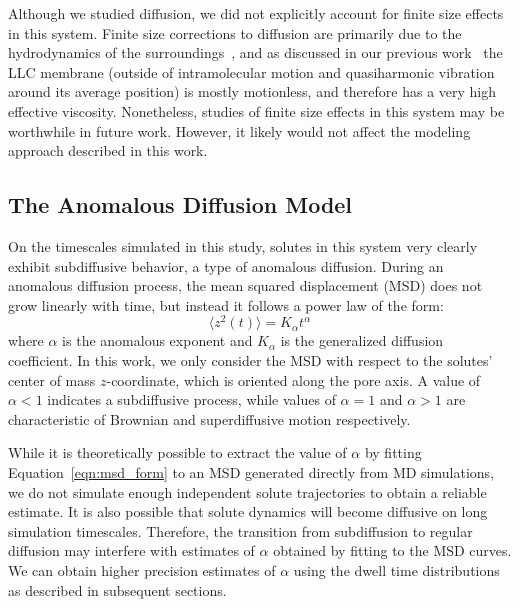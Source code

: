 \documentclass[journal=jctcce,manuscript=article]{achemso}
\begin{document}
  Although we studied diffusion, we did not explicitly account for finite size effects
  in this system. Finite size corrections to diffusion are primarily due to the
  hydrodynamics of the surroundings~\cite{venable_lipid_2017,yeh_system-size_2004}, and
  as discussed in our previous work~\cite{coscia_understanding_2019} the LLC membrane
  (outside of intramolecular motion and quasiharmonic vibration around its average 
  position) is mostly motionless, and therefore has a very high effective viscosity.
  Nonetheless, studies of finite size effects in this system may be worthwhile in
  future work. However, it likely would not affect the modeling approach described in
  this work.

  \subsection{The Anomalous Diffusion Model}\label{method:model_sFBM}

  On the timescales simulated in this study, solutes in this system very 
  clearly exhibit subdiffusive behavior, a type of anomalous diffusion. 
  During an anomalous diffusion process, the mean squared displacement (MSD)
  does not grow linearly with time, but instead it follows a power law of 
  the form: 
  \begin{equation} 
  \langle z^2(t) \rangle = K_{\alpha}t^{\alpha}
  \label{eqn:msd_form}
  \end{equation} 
  where $\alpha$ is the anomalous exponent and $K_{\alpha}$ is the generalized 
  diffusion coefficient. In this work, we only consider the MSD with respect to
  the solutes' center of mass $z$-coordinate, which is oriented along the pore 
  axis. A value of $\alpha < 1$ indicates a subdiffusive process, while values
  of $\alpha = 1$ and $\alpha > 1$ are characteristic of Brownian and 
  superdiffusive motion respectively.
 
  While it is theoretically possible to extract the value of $\alpha$ by fitting
  Equation~\ref{eqn:msd_form} to an MSD generated directly from MD simulations, 
  we do not simulate enough independent solute trajectories to obtain a reliable
  estimate. It is also possible that solute dynamics will become diffusive on
  long simulation timescales. Therefore, the transition from subdiffusion to regular
  diffusion may interfere with estimates of $\alpha$ obtained by fitting to the MSD
  curves. We can obtain higher precision estimates of $\alpha$ using the dwell
  time distributions as described in subsequent sections.
  
\end{document}
